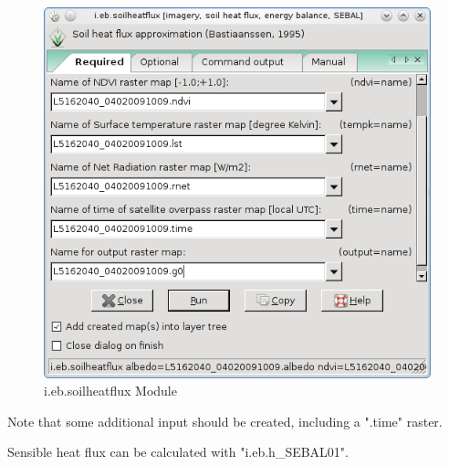 \begin{figure}[htbp]
   \centering
   \includegraphics[scale=0.4]{gipe021.png}
   \caption{i.eb.soilheatflux Module}
   \label{fig:gipe021}
\end{figure}

Note that some additional input should be created, including a ".time" raster.\newline

Sensible heat flux can be calculated with "i.eb.h\_SEBAL01".\newline

